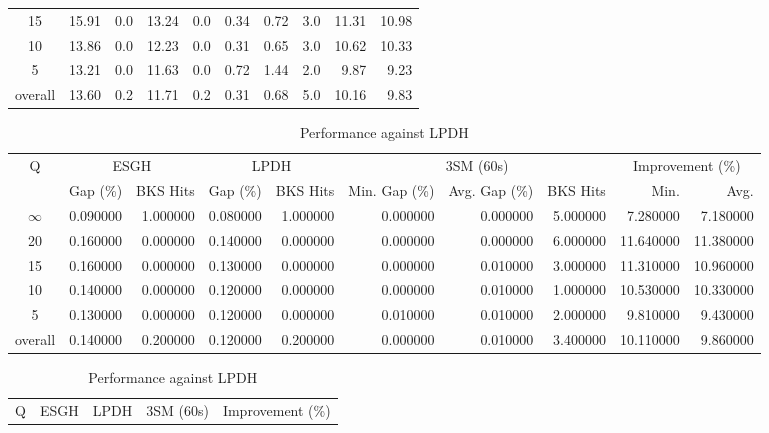 \begin{table}[H]
\begin{tabular}{c rr rr rrr rr}
      15 &    15.91 &      0.0 &    13.24 &      0.0 &          0.34 &          0.72 &      3.0 &            11.31 & 10.98 \\
      10 &    13.86 &      0.0 &    12.23 &      0.0 &          0.31 &          0.65 &      3.0 &            10.62 & 10.33 \\
       5 &    13.21 &      0.0 &    11.63 &      0.0 &          0.72 &          1.44 &      2.0 &             9.87 &  9.23 \\
\midrule
 overall &    13.60 &      0.2 &    11.71 &      0.2 &          0.31 &          0.68 &      5.0 &            10.16 &  9.83 \\
\bottomrule
\end{tabular}
\end{table}\begin{table}[H]
\caption{Performance against LPDH}
\label{tab:3lm_resuts_kritikos2}
\begin{tabular}{c rr rr rrr rr}
\toprule
Q & \multicolumn{2}{c}{ESGH} & \multicolumn{2}{c}{LPDH} & \multicolumn{3}{c}{3SM (60s)} & \multicolumn{2}{c}{Improvement (\%)} \\
 & Gap (\%) & BKS Hits & Gap (\%) & BKS Hits & Min. Gap (\%) & Avg. Gap (\%) & BKS Hits & Min. & Avg. \\
\midrule
$\infty$ & 0.090000 & 1.000000 & 0.080000 & 1.000000 & 0.000000 & 0.000000 & 5.000000 & 7.280000 & 7.180000 \\
20 & 0.160000 & 0.000000 & 0.140000 & 0.000000 & 0.000000 & 0.000000 & 6.000000 & 11.640000 & 11.380000 \\
15 & 0.160000 & 0.000000 & 0.130000 & 0.000000 & 0.000000 & 0.010000 & 3.000000 & 11.310000 & 10.960000 \\
10 & 0.140000 & 0.000000 & 0.120000 & 0.000000 & 0.000000 & 0.010000 & 1.000000 & 10.530000 & 10.330000 \\
5 & 0.130000 & 0.000000 & 0.120000 & 0.000000 & 0.010000 & 0.010000 & 2.000000 & 9.810000 & 9.430000 \\
\midrule
overall & 0.140000 & 0.200000 & 0.120000 & 0.200000 & 0.000000 & 0.010000 & 3.400000 & 10.110000 & 9.860000 \\
\bottomrule
\end{tabular}
\end{table}\begin{table}[H]
\caption{Performance against LPDH}
\label{tab:3lm_resuts_kritikos2}
\begin{tabular}{c rr rr rrr rr}
\toprule
Q & \multicolumn{2}{c}{ESGH} & \multicolumn{2}{c}{LPDH} & \multicolumn{3}{c}{3SM (60s)} & \multicolumn{2}{c}{Improvement (\%)} \\

\end{tabular}
\end{table}
